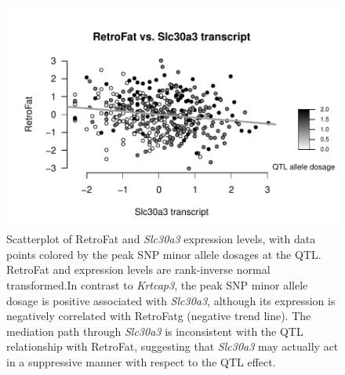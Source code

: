 \begin{figure}
\centering
\includegraphics[width=\textwidth, trim={0in 0in 0 0.75in}, clip]{figures/5-hsrats/Slc30a3_scatter.pdf}
\caption[Scatterplot of RetroFat by \textit{Slc30a3} suggests a suppressor]{Scatterplot of RetroFat and \textit{Slc30a3} expression levels, with data points colored by the peak SNP minor allele dosages at the QTL. RetroFat and expression levels are rank-inverse normal transformed.In contrast to \textit{Krtcap3}, the peak SNP minor allele dosage is positive associated with \textit{Slc30a3}, although its expression is negatively correlated with RetroFatg (negative trend line). The mediation path through \textit{Slc30a3} is inconsistent with the QTL relationship with RetroFat, suggesting that \textit{Slc30a3} may actually act in a suppressive manner with respect to the QTL effect. \label{fig:slc30a3}}
\end{figure}


